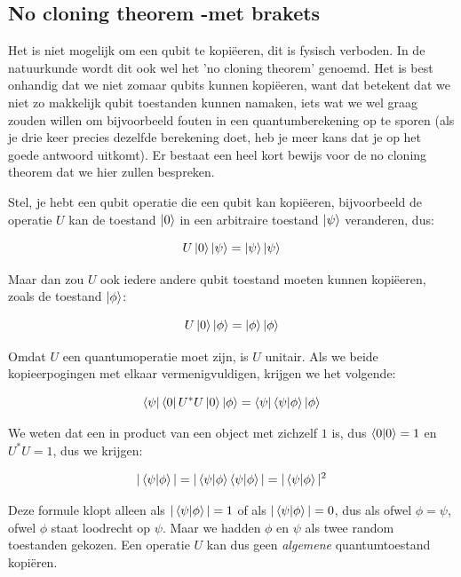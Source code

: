 \documentclass[../main.tex]{subfiles}
\begin{document}
\onlyinsubfile{
\setcounter{chapter}{1}
}
\notinsubfile{}

\subsection*{No cloning theorem -met brakets}
Het is niet mogelijk om een qubit te kopi\"{e}eren, dit is fysisch verboden. In de natuurkunde wordt dit ook wel het 'no cloning theorem' genoemd. Het is best onhandig dat we niet zomaar qubits kunnen kopi\"{e}eren, want dat betekent dat we niet zo makkelijk qubit toestanden kunnen namaken, iets wat we wel graag zouden willen om bijvoorbeeld fouten in een quantumberekening op te sporen (als je drie keer precies dezelfde berekening doet, heb je meer kans dat je op het goede antwoord uitkomt).
Er bestaat een heel kort bewijs voor de no cloning theorem dat we hier zullen bespreken.

Stel, je hebt een qubit operatie die een qubit kan kopi\"{e}eren, bijvoorbeeld de operatie $U$ kan de toestand $\ket{0}$ in een arbitraire toestand $\ket{\psi}$ veranderen, dus:

\begin{equation*}
U\ket{0}\ket{\psi} = \ket{\psi}\ket{\psi}
\end{equation*}

Maar dan zou $U$ ook iedere andere qubit toestand moeten kunnen kopi\"{e}eren, zoals de toestand $\ket{\phi}$:

\begin{equation*}
U\ket{0}\ket{\phi} = \ket{\phi}\ket{\phi}
\end{equation*}

Omdat $U$ een quantumoperatie moet zijn, is $U$ unitair. Als we beide kopieerpogingen met elkaar vermenigvuldigen, krijgen we het volgende:

\begin{equation*}
\bra{\psi}\bra{0}U^*U\ket{0}\ket{\phi} = \bra{\psi}\bra{\psi}\ket{\phi}\ket{\phi}
\end{equation*}

We weten dat een in product van een object met zichzelf $1$ is, dus $\bra{0}\ket{0}=1$ en $U^*U=1$, dus we krijgen:

\begin{equation*}
|\bra{\psi}\ket{\phi}| = |\bra{\psi}\ket{\phi}\bra{\psi}\ket{\phi}| = |\bra{\psi}\ket{\phi}|^2
\end{equation*}

Deze formule klopt alleen als $|\bra{\psi}\ket{\phi}| = 1$ of als $|\bra{\psi}\ket{\phi}| = 0$, dus als ofwel $\phi=\psi$, ofwel $\phi$ staat loodrecht op $\psi$. Maar we hadden $\phi$ en $\psi$ als twee random toestanden gekozen. Een operatie $U$ kan dus geen \textit{algemene} quantumtoestand kopi\"{e}ren.
\end{document}
